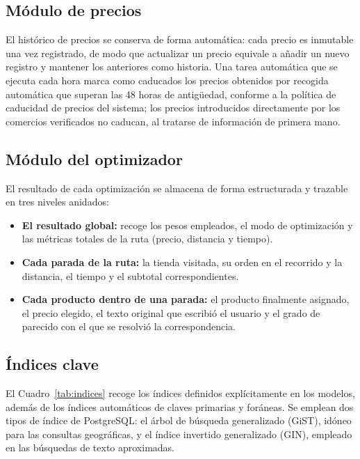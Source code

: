 \subsection{M\'odulo de precios}\label{subsec:modelo-precios}

El hist\'orico de precios se conserva de forma autom\'atica: cada precio es inmutable una vez
registrado, de modo que actualizar un precio equivale a a\~nadir un nuevo registro y mantener los
anteriores como historia. Una tarea autom\'atica que se ejecuta cada hora marca como caducados los
precios obtenidos por recogida autom\'atica que superan las 48 horas de antig\"uedad, conforme a la
pol\'itica de caducidad de precios del sistema; los precios introducidos directamente por los
comercios verificados no caducan, al tratarse de informaci\'on de primera mano.

\subsection{M\'odulo del optimizador}\label{subsec:modelo-optimizador}

El resultado de cada optimizaci\'on se almacena de forma estructurada y trazable en tres niveles
anidados:

\begin{itemize}
  \item \textbf{El resultado global:} recoge los pesos empleados, el modo de optimizaci\'on y las
    m\'etricas totales de la ruta (precio, distancia y tiempo).
  \item \textbf{Cada parada de la ruta:} la tienda visitada, su orden en el recorrido y la
    distancia, el tiempo y el subtotal correspondientes.
  \item \textbf{Cada producto dentro de una parada:} el producto finalmente asignado, el precio
    elegido, el texto original que escribi\'o el usuario y el grado de parecido con el que se
    resolvi\'o la correspondencia.
\end{itemize}

\subsection{\'Indices clave}\label{subsec:indices}

El Cuadro~\ref{tab:indices} recoge los \'indices definidos expl\'icitamente en los modelos,
adem\'as de los \'indices autom\'aticos de claves primarias y for\'aneas. Se emplean dos tipos de
\'indice de PostgreSQL: el \'arbol de b\'usqueda generalizado (GiST), id\'oneo para las consultas
geogr\'aficas, y el \'indice invertido generalizado (GIN), empleado en las b\'usquedas de texto
aproximadas.

